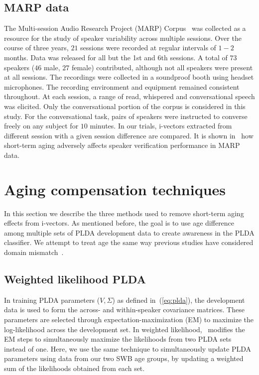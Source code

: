 \documentclass[a4paper]{article}
\begin{document}
\subsection{MARP data}
The Multi-session Audio Research Project (MARP) Corpus~\cite{paper12} was collected as a resource for the study of speaker variability across multiple sessions. Over the course of three years, $21$ sessions were recorded at regular intervals of $1-2$ months. Data was released for all but the 1st and 6th sessions. A total of $73$ speakers ($46$ male, $27$ female) contributed, although not all speakers were present at all sessions. The recordings were collected in a soundproof booth using headset microphones. The recording environment and equipment remained consistent throughout. At each session, a range of read, whispered and conversational speech was elicited. Only the conversational portion of the corpus is considered in this study. For the conversational task, pairs of speakers were instructed to converse freely on any subject for $10$ minutes. In our trials, i-vectors extracted from different session with a given session difference are compared. It is shown in~\cite{kellyinterspeech15} how short-term aging adversely affects speaker verification performance in MARP data. 


\section{Aging compensation techniques}
\label{sec:adaptation}
In this section we describe the three methods used to remove short-term aging effects from i-vectors. As mentioned before, the goal is to use age difference among multiple sets of PLDA development data to create awareness in the PLDA classifier. We attempt to treat age the same way previous studies have considered domain mismatch~\cite{garcia2014supervised}. 

\subsection{Weighted likelihood PLDA}
In training PLDA parameters ($V,\Sigma$) as defined in~(\ref{eq:plda}), the development data is used to form the across- and within-speaker covariance matrices. These parameters are selected through expectation-maximization (EM) to maximize the log-likelihood across the development set. In weighted likelihood,~\cite{garcia2014supervised} modifies the EM steps to simultaneously maximize the likelihoods from two PLDA sets instead of one. Here, we use the same technique to simultaneously update PLDA parameters using data from our two SWB age groups, by updating a weighted sum of the likelihoods obtained from each set. 
\end{document}
